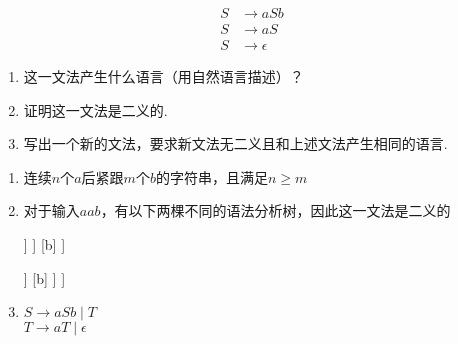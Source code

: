\documentclass[logo,reportComp]{thesis}
\begin{document}
\begin{question}
\[\begin{aligned}
S &\to aSb\\
S &\to aS\\
S &\to \epsilon
\end{aligned}\]
\begin{enumerate}
	\item 这一文法产生什么语言（用自然语言描述）？
	\item 证明这一文法是二义的.
	\item 写出一个新的文法，要求新文法无二义且和上述文法产生相同的语言.
\end{enumerate}
\end{question}
\begin{answer}
\begin{enumerate}
	\item 连续$n$个$a$后紧跟$m$个$b$的字符串，且满足$n\geq m$
	\item 对于输入$aab$，有以下两棵不同的语法分析树，因此这一文法是二义的\\
\begin{minipage}{0.5\linewidth}
\begin{center}
\begin{forest}
[S
	[a]
	[S
		[a]
		[S
			[$\epsilon$]
		]
	]
	[b]
]
\end{forest}
\end{center}
\end{minipage}
\begin{minipage}{0.5\linewidth}
\begin{center}
\begin{forest}
[S
	[a]
	[S
		[a]
		[S
			[$\epsilon$]
		]
		[b]
	]
]
\end{forest}
\end{center}
\end{minipage}
	\item $S\to aSb\mid T$\\
	$T\to aT\mid\epsilon$
\end{enumerate}
\end{answer}
\end{document}
